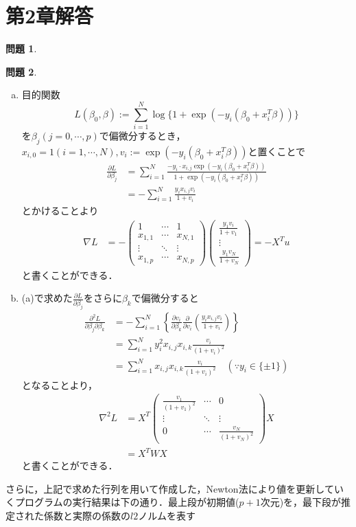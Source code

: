 \documentclass[titlepage]{jsarticle}
\theoremstyle{definition}
\newtheorem{Ex}{問題}
\theoremstyle{mystyle} %
\begin{document}
\section{第2章解答}
\begin{Ex}

\end{Ex}
\begin{Ex}
\begin{enumerate}[(a)]
\item 目的関数
$$L(\beta_0,\beta):=\sum_{i=1}^N \log\{1+\exp(-y_i(\beta_0+x_i^T \beta))\}$$
を$\beta_j(j=0,\cdots,p)$で偏微分するとき，$x_{i,0}=1(i=1,\cdots ,N),v_i :=\exp(-y_i(\beta_0+x_i^T \beta)) $と置くことで
\begin{align*}
\frac{\partial L}{\partial \beta_j}&=\sum_{i=1}^N\frac{-y_i\cdot x_{i,j}\exp(-y_i(\beta_0+x_i^T \beta))}{1+\exp(-y_i(\beta_0+x_i^T \beta))}\\
&=-\sum_{i=1}^N\frac{y_ix_{i,j} v_i}{1+v_i}
\end{align*}
とかけることより
\begin{align*}
\nabla L&=-\begin{pmatrix}
1 & \cdots & 1\\
x_{1,1} & \cdots & x_{N,1}\\
\vdots & \ddots & \vdots \\
x_{1,p} & \cdots & x_{N,p}
\end{pmatrix}\left(\begin{array}{c}
\frac{y_1 v_i}{1+v_1}\\
\vdots \\
\frac{y_1 v_N}{1+v_N}
\end{array}\right)=-X^T u
\end{align*}
と書くことができる．\\

\item (a)で求めた$\frac{\partial L}{\partial \beta_j}$をさらに$\beta_k$で偏微分すると
\begin{align*}
\frac{\partial^2 L}{\partial \beta_j \partial \beta_k}&=-\sum_{i=1}^N \left\{\frac{\partial v_i}{\partial \beta_k}\frac{\partial }{\partial v_i}\left(\frac{y_ix_{i,j}v_i}{1+v_i}\right)\right\}\\
&=\sum_{i=1}^Ny_i^2x_{i,j}x_{i,k}\frac{v_i}{(1+v_i)^2}\\
&=\sum_{i=1}^Nx_{i,j}x_{i,k}\frac{v_i}{(1+v_i)^2}\quad(\because y_i\in \{\pm 1\})
\end{align*}
となることより，
\begin{align*}
\nabla^2 L &=X^T\begin{pmatrix}
\frac{v_1}{(1+v_1)^2} & \cdots & 0\\
\vdots & \ddots & \vdots \\
0 & \cdots & \frac{v_N}{(1+v_N)^2}
\end{pmatrix}X\\
&=X^TWX
\end{align*}
と書くことができる．\\
\end{enumerate}
さらに，上記で求めた行列を用いて作成した，Newton法により値を更新していくプログラムの実行結果は下の通り．最上段が初期値($p+1$次元)を，最下段が推定された係数と実際の係数の$l2$ノルムを表す


\end{Ex}
\end{document}
